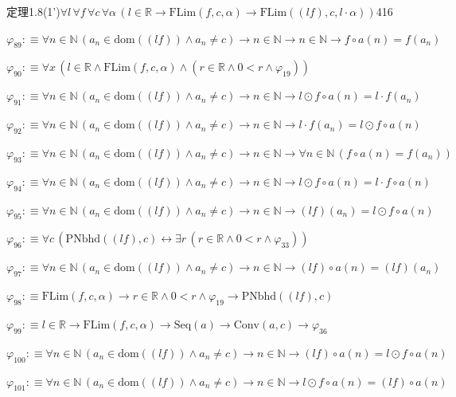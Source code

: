 \begin{fullproof}{定理1.8(1')}{$\forall l\,\forall f\,\forall c\,\forall \alpha\,(l \in \mathbb{R} \to \mathrm{FLim}(f,c,\alpha) \to \mathrm{FLim}((l f),c,l \cdot \alpha))$}{416}
\begin{abbrevlist}
\item $\varphi_{89} :\equiv \forall n \in \mathbb{N}\,(a_{n} \in \mathrm{dom}((l f)) \land a_{n} \neq c) \to n \in \mathbb{N} \to n \in \mathbb{N} \to f \circ a(n) = f(a_{n})$
\item $\varphi_{90} :\equiv \forall x\,(l \in \mathbb{R} \land \mathrm{FLim}(f,c,\alpha) \land (r \in \mathbb{R} \land 0 < r \land \varphi_{19}))$
\item $\varphi_{91} :\equiv \forall n \in \mathbb{N}\,(a_{n} \in \mathrm{dom}((l f)) \land a_{n} \neq c) \to n \in \mathbb{N} \to l \odot f \circ a(n) = l \cdot f(a_{n})$
\item $\varphi_{92} :\equiv \forall n \in \mathbb{N}\,(a_{n} \in \mathrm{dom}((l f)) \land a_{n} \neq c) \to n \in \mathbb{N} \to l \cdot f(a_{n}) = l \odot f \circ a(n)$
\item $\varphi_{93} :\equiv \forall n \in \mathbb{N}\,(a_{n} \in \mathrm{dom}((l f)) \land a_{n} \neq c) \to n \in \mathbb{N} \to \forall n \in \mathbb{N}\,(f \circ a(n) = f(a_{n}))$
\item $\varphi_{94} :\equiv \forall n \in \mathbb{N}\,(a_{n} \in \mathrm{dom}((l f)) \land a_{n} \neq c) \to n \in \mathbb{N} \to l \odot f \circ a(n) = l \cdot f \circ a(n)$
\item $\varphi_{95} :\equiv \forall n \in \mathbb{N}\,(a_{n} \in \mathrm{dom}((l f)) \land a_{n} \neq c) \to n \in \mathbb{N} \to (l f)(a_{n}) = l \odot f \circ a(n)$
\item $\varphi_{96} :\equiv \forall c\,(\mathrm{PNbhd}((l f),c) \leftrightarrow \exists r\,(r \in \mathbb{R} \land 0 < r \land \varphi_{33}))$
\item $\varphi_{97} :\equiv \forall n \in \mathbb{N}\,(a_{n} \in \mathrm{dom}((l f)) \land a_{n} \neq c) \to n \in \mathbb{N} \to (l f) \circ a(n) = (l f)(a_{n})$
\item $\varphi_{98} :\equiv \mathrm{FLim}(f,c,\alpha) \to r \in \mathbb{R} \land 0 < r \land \varphi_{19} \to \mathrm{PNbhd}((l f),c)$
\item $\varphi_{99} :\equiv l \in \mathbb{R} \to \mathrm{FLim}(f,c,\alpha) \to \mathrm{Seq}(a) \to \mathrm{Conv}(a,c) \to \varphi_{36}$
\item $\varphi_{100} :\equiv \forall n \in \mathbb{N}\,(a_{n} \in \mathrm{dom}((l f)) \land a_{n} \neq c) \to n \in \mathbb{N} \to (l f) \circ a(n) = l \odot f \circ a(n)$
\item $\varphi_{101} :\equiv \forall n \in \mathbb{N}\,(a_{n} \in \mathrm{dom}((l f)) \land a_{n} \neq c) \to n \in \mathbb{N} \to l \odot f \circ a(n) = (l f) \circ a(n)$

\end{abbrevlist}
\end{fullproof}
